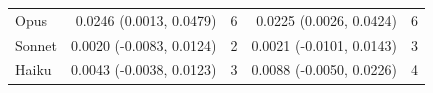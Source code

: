 \begin{tabular}{p{2.2cm}rrrr}
\quad Opus & 0.0246 (0.0013, 0.0479) & 6 & 0.0225 (0.0026, 0.0424) & 6 \\
\quad Sonnet & 0.0020 (-0.0083, 0.0124) & 2 & 0.0021 (-0.0101, 0.0143) & 3 \\
\quad Haiku & 0.0043 (-0.0038, 0.0123) & 3 & 0.0088 (-0.0050, 0.0226) & 4 \\
\bottomrule
\end{tabular}
